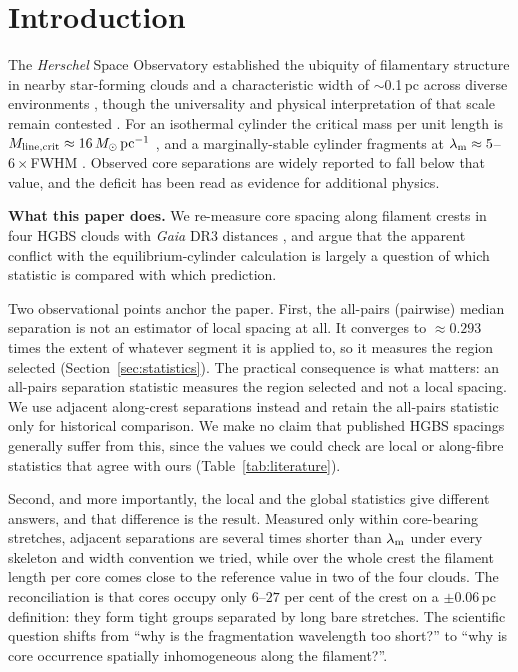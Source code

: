 \documentclass[usenatbib,twoside,twocolumn]{mnras}
\begin{document}
\section{Introduction}
\label{sec:intro}

The \textit{Herschel} Space Observatory established the ubiquity of filamentary structure in nearby star-forming clouds \citep{Andre2010} and a characteristic width of $\sim$0.1\,pc across diverse environments \citep{Arzoumanian2011}, though the universality and physical interpretation of that scale remain contested \citep{Panopoulou2017,Panopoulou2022}. For an isothermal cylinder the critical mass per unit length is $M_{\rm line,crit}\approx16\,M_\odot\,{\rm pc^{-1}}$ \citep{Ostriker1964}, and a marginally-stable cylinder fragments at $\lambda_{\rm m}\approx5$--$6\times$FWHM \citep{Inutsuka1992,Fischera2012}. Observed core separations are widely reported to fall below that value, and the deficit has been read as evidence for additional physics.

\smallskip\noindent\textbf{What this paper does.} We re-measure core spacing along filament crests in four HGBS clouds with \textit{Gaia} DR3 distances \citep{Zhang2023}, and argue that the apparent conflict with the equilibrium-cylinder calculation is largely a question of which statistic is compared with which prediction.

Two observational points anchor the paper. First, the all-pairs (pairwise) median separation is not an estimator of local spacing at all. It converges to $\approx0.293$ times the extent of whatever segment it is applied to, so it measures the region selected (Section~\ref{sec:statistics}). The practical consequence is what matters: an all-pairs separation statistic measures the region selected and not a local spacing. We use adjacent along-crest separations instead and retain the all-pairs statistic only for historical comparison. We make no claim that published HGBS spacings generally suffer from this, since the values we could check are local or along-fibre statistics that agree with ours (Table~\ref{tab:literature}).

Second, and more importantly, the local and the global statistics give different answers, and that difference is the result. Measured only within core-bearing stretches, adjacent separations are several times shorter than $\lambda_{\rm m}$ under every skeleton and width convention we tried, while over the whole crest the filament length per core comes close to the reference value in two of the four clouds. The reconciliation is that cores occupy only $6$--$27$ per cent of the crest on a $\pm0.06$\,pc definition: they form tight groups separated by long bare stretches. The scientific question shifts from ``why is the fragmentation wavelength too short?'' to ``why is core occurrence spatially inhomogeneous along the filament?''.
\end{document}
